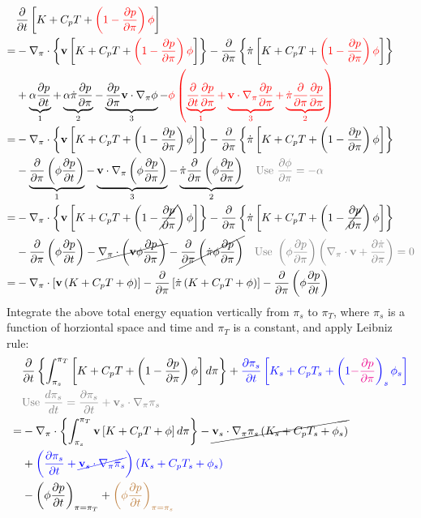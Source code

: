 \documentclass[12pt]{article}
\numberwithin{equation}{section}
\renewcommand{\d}[2]{\frac{d #1}{d #2}}
\newcommand{\dt}[1]{\d{#1}{t}}
\newcommand{\pd}[2]{\frac{\partial #1}{\partial #2}}
\newcommand{\pdt}[1]{\pd{#1}{t}}
\renewcommand{\vec}[1]{\mathbf{#1}}
\newcommand{\grad}[2][\pi]{\nabla_{#1} #2}
\renewcommand{\div}[2][\pi]{\nabla_{#1} \cdot #2}
\begin{document}
\begin{align*}
  & \pdt{} \left[K + C_p T + {\color{red}\left(1 - \pd{p}{\pi}\right) \phi}\right] \\
  = & - \div{\left\{\vec{v} \left[K + C_p T + {\color{red}\left(1 - \pd{p}{\pi}\right) \phi}\right]\right\}} - \pd{}{\pi} \left\{\dot{\pi} \left[K + C_p T + {\color{red}\left(1 - \pd{p}{\pi}\right) \phi}\right]\right\} \\
  & + \underbrace{\alpha \pdt{p}}_1 + \underbrace{\alpha \dot{\pi} \pd{p}{\pi}}_2 - \underbrace{\pd{p}{\pi} \vec{v} \cdot \grad{\phi}}_3 - {\color{red}\phi \left(\underbrace{\pdt{} \pd{p}{\pi}}_1 + \underbrace{\vec{v} \cdot \grad{\pd{p}{\pi}}}_3 + \underbrace{\dot{\pi} \pd{}{\pi} \pd{p}{\pi}}_2\right)} \\
  = & - \div{\left\{\vec{v} \left[K + C_p T + \left(1 - \pd{p}{\pi}\right) \phi\right]\right\}} - \pd{}{\pi} \left\{\dot{\pi} \left[K + C_p T + \left(1 - \pd{p}{\pi}\right) \phi\right]\right\} \\
  & - \underbrace{\pd{}{\pi} \left(\phi \pdt{p}\right)}_1 - \underbrace{\vec{v} \cdot \grad{\left(\phi \pd{p}{\pi}\right)}}_3 - \underbrace{\dot{\pi} \pd{}{\pi} \left(\phi \pd{p}{\pi}\right)}_2 {\color{gray}\text{\quad Use } \pd{\phi}{\pi} = - \alpha} \\
  = & - \div{\left\{\vec{v} \left[K + C_p T + \left(1 - \cancel{\pd{p}{\pi}}\right) \phi\right]\right\}} - \pd{}{\pi} \left\{\dot{\pi} \left[K + C_p T + \left(1 - \cancel{\pd{p}{\pi}}\right) \phi\right]\right\} \\
  & - \pd{}{\pi} \left(\phi \pdt{p}\right) - \cancel{\div{\left(\vec{v} \phi \pd{p}{\pi}\right)}} - \cancel{\pd{}{\pi} \left(\dot{\pi} \phi \pd{p}{\pi}\right)} {\color{gray}\text{\quad Use } \left(\phi \pd{p}{\pi}\right) \left(\div{\vec{v}} + \pd{\dot{\pi}}{\pi}\right) = 0} \\
  = & - \div{\left[\vec{v} \left(K + C_p T + \phi\right)\right]} - \pd{}{\pi} \left[\dot{\pi} \left(K + C_p T + \phi\right)\right] - \pd{}{\pi} \left(\phi \pdt{p}\right)
\end{align*}
Integrate the above total energy equation vertically from $\pi_s$ to $\pi_T$, where $\pi_s$ is a function of horziontal space and time and $\pi_T$ is a constant, and apply Leibniz rule:
\pagebreak
\begin{align*}
  & \pdt{} \left\{\int_{\pi_s}^{\pi_T} \left[K + C_p T + \left(1 - \pd{p}{\pi}\right) \phi\right] d\pi\right\} + {\color{blue}\pdt{\pi_s} \left[K_s + C_p T_s + \left(1 {\color{magenta}- \pd{p}{\pi}}\right)_s \phi_s\right]} \\
  & {\color{gray}\text{Use } \dt{\pi_s} = \pdt{\pi_s} + \vec{v}_s \cdot \grad{\pi_s}} \\
  = & - \div{\left\{\int_{\pi_s}^{\pi_T} \vec{v} \left[K + C_p T + \phi\right] d\pi\right\}} - \cancel{\vec{v}_s \cdot \grad{\pi_s} \left(K_s + C_p T_s + \phi_s\right)} \\
  & + {\color{blue}\left(\pdt{\pi_s} + \cancel{\vec{v}_s \cdot \grad{\pi_s}}\right) \left(K_s + C_p T_s + \phi_s\right)} \\
  & - \left(\phi \pdt{p}\right)_{\pi = \pi_T} + {\color{brown}\left(\phi \pdt{p}\right)_{\pi = \pi_s}}
\end{align*}
\end{document}
